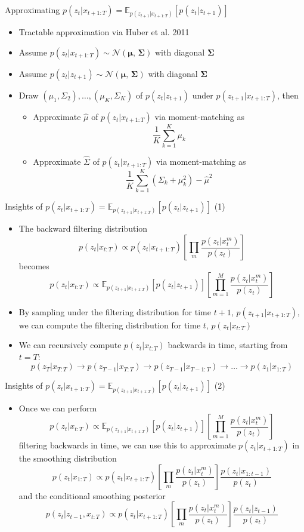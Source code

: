 \documentclass{beamer}
\begin{document}
\begin{frame}{Approximating $p(z_t|x_{t+1:T})=\mathbb{E}_{p(z_{t+1}|x_{t+1:T})}[p(z_t|z_{t+1})]$}
\begin{itemize}
\item Tractable approximation via Huber et al. 2011
\item Assume $p(z_t|x_{t+1:T})\sim \mathcal{N}(\boldsymbol\mu,\,\boldsymbol\Sigma)$ with diagonal $\boldsymbol\Sigma$
\item Assume $p(z_t|z_{t+1})\sim \mathcal{N}(\boldsymbol\mu,\,\boldsymbol\Sigma)$ with diagonal $\boldsymbol\Sigma$
\item Draw $(\mu_1,\Sigma_2),\dots,(\mu_K,\Sigma_K)$ of $p(z_t|z_{t+1})$ under $p(z_{t+1}|x_{t+1:T})$, then
\begin{itemize}
\item Approximate $\hat\mu$ of $p(z_t|x_{t+1:T})$ via moment-matching as\[
\frac{1}{K}\sum_{k=1}^K\mu_k
\]
\item Approximate $\hat\Sigma$ of $p(z_t|x_{t+1:T})$ via moment-matching as\[
\frac{1}{K}\sum_{k=1}^K(\Sigma_k+\mu_k^2)-\hat{\mu}^2
\]
\end{itemize}
\end{itemize}
\end{frame}

\begin{frame}{Insights of $p(z_t|x_{t+1:T})=\mathbb{E}_{p(z_{t+1}|x_{t+1:T})}[p(z_t|z_{t+1})]$ (1)}
\begin{itemize}
\item The backward filtering distribution\[
p(z_t|x_{t:T})\propto p(z_t|x_{t+1:T})\left[\prod_m\frac{p(z_t|x_t^m)}{p(z_t)}\right]
\]becomes\[
p(z_t|x_{t:T})\propto\mathbb{E}_{p(z_{t+1}|x_{t+1:T})}[p(z_t|z_{t+1})]\left[\prod_{m=1}^M\frac{p(z_t|x_t^m)}{p(z_t)}\right]
\]
\item By sampling under the filtering distribution for time $t+1$, $p(z_{t+1}|x_{t+1:T})$, we can compute the filtering distribution for time $t$, $p(z_t|x_{t:T})$
\item We can recursively compute $p(z_t|x_{t:T})$ backwards in time, starting from $t=T$:\[
p(z_{T}|x_{T:T})\to p(z_{T-1}|x_{T:T})\to p(z_{T-1}|x_{T-1:T})\to\dots\to p(z_1|x_{1:T})
\]
\end{itemize}
\end{frame}

\begin{frame}{Insights of $p(z_t|x_{t+1:T})=\mathbb{E}_{p(z_{t+1}|x_{t+1:T})}[p(z_t|z_{t+1})]$ (2)}
\begin{itemize}
\item Once we can perform \[
p(z_t|x_{t:T})\propto\mathbb{E}_{p(z_{t+1}|x_{t+1:T})}[p(z_t|z_{t+1})]\left[\prod_{m=1}^M\frac{p(z_t|x_t^m)}{p(z_t)}\right]
\]filtering backwards in time, we can use this to approximate $p(z_t|x_{t+1:T})$ in the smoothing distribution\[
p(z_t|x_{1:T})\propto p(z_t|x_{t+1:T})\left[\prod_m\frac{p(z_t|x_t^m)}{p(z_t)}\right]\frac{p(z_t|x_{1:t-1})}{p(z_t)}
\]and the conditional smoothing posterior\[
p(z_t|z_{t-1},x_{t:T})\propto p(z_t|x_{t+1:T})\left[\prod_m \frac{p(z_t|x_t^m)}{p(z_t)}\right]\frac{p(z_t|z_{t-1})}{p(z_t)}
\]
\end{itemize}
\end{frame}
\end{document}
